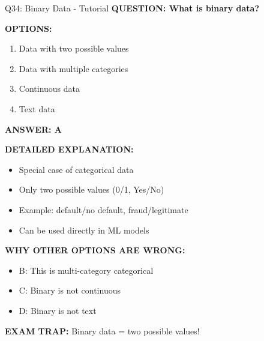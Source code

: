 \documentclass[8pt]{beamer}
\begin{document}
	\begin{frame}{Q34: Binary Data - Tutorial}
		\fontsize{6.5}{7.5}\selectfont
		\textbf{QUESTION: What is binary data?}
		
		\vspace{0.1cm}
		\textbf{OPTIONS:}
		\begin{enumerate}
			\item Data with two possible values
			\item Data with multiple categories
			\item Continuous data
			\item Text data
		\end{enumerate}
		
		\vspace{0.1cm}
		\textcolor{myblue}{\textbf{ANSWER: A}}
		
		\vspace{0.1cm}
		\textbf{DETAILED EXPLANATION:}
		\begin{itemize}
			\item Special case of categorical data
			\item Only two possible values (0/1, Yes/No)
			\item Example: default/no default, fraud/legitimate
			\item Can be used directly in ML models
		\end{itemize}
		
		\vspace{0.1cm}
		\textcolor{myred}{\textbf{WHY OTHER OPTIONS ARE WRONG:}}
		\begin{itemize}
			\item \textcolor{myred}{B:} This is multi-category categorical
			\item \textcolor{myred}{C:} Binary is not continuous
			\item \textcolor{myred}{D:} Binary is not text
		\end{itemize}
		
		\textcolor{myred}{\textbf{EXAM TRAP:}} Binary data = \textcolor{myblue}{two possible values}!
	\end{frame}
	
\end{document}
